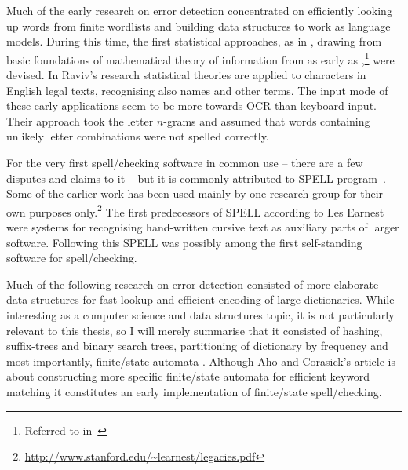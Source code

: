 \documentclass[officiallayout,final]{unihelcompling}
\begin{document}
Much of the early research on error detection
concentrated on efficiently looking up words from finite wordlists and
building data structures to work as \glspl{language model}. During this time,
the first statistical approaches, as in \citet{raviv1967decision}, drawing
from basic foundations of mathematical theory of information from as early as
\citet{shannon1948mathematical},\footnote{Referred to 
in~\citet{liberman2012noisily}} were devised. In
Raviv's research statistical theories are applied to characters in English
legal texts, recognising also names and other terms. The input mode of these
early applications seem to be more towards OCR than keyboard input. Their
approach took the letter \(n\)-grams and assumed that words containing unlikely
letter combinations were not spelled correctly.

For the very first spell\-/checking software in common use -- there are a few
disputes and claims to it -- but it is commonly attributed to SPELL
program~\citep{gorin1971spell}.  Some of the earlier work has been used mainly
by one research group for their own purposes
only.\footnote{\url{http://www.stanford.edu/~learnest/legacies.pdf}} The first
predecessors of SPELL according to Les Earnest were systems for recognising
hand-written cursive text as auxiliary parts of larger software. Following this
SPELL was possibly among the first self-standing software for spell\-/checking.


Much of the following research on error detection consisted of more elaborate
data structures for fast lookup and efficient encoding of large dictionaries.
While interesting as a computer science and data structures topic, it is not
particularly relevant to this thesis, so I will merely summarise that it
consisted of hashing, suffix-trees and binary search trees, partitioning of
dictionary by frequency \citep{knuth1973art} and most importantly,
finite\-/state automata \citep{aho1975efficient}. Although Aho and Corasick's
article is about constructing more specific finite\-/state automata for
efficient keyword matching it constitutes an early implementation of
finite\-/state spell\-/checking.
\end{document}
